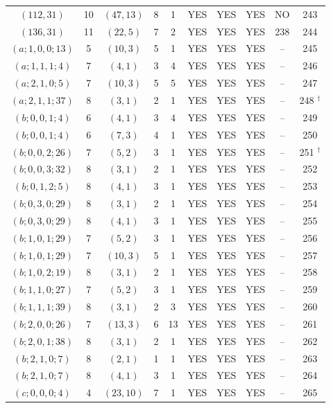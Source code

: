 \begin{longtable}{|c|c|c|c|c|c|c|c|c|c|}
$(112, 31)$ & 10 & $(47, 13)$ & 8 & 1 & YES & YES & YES & NO & 243\\
$(136, 31)$ & 11 & $(22, 5)$ & 7 & 2 & YES & YES & YES & 238 & 244\\
$(a; 1, 0, 0; 13)$ & 5 & $(10, 3)$ & 5 & 1 & YES & YES & YES & -- & 245\\
$(a; 1, 1, 1; 4)$ & 7 & $(4, 1)$ & 3 & 4 & YES & YES & YES & -- & 246\\
$(a; 2, 1, 0; 5)$ & 7 & $(10, 3)$ & 5 & 5 & YES & YES & YES & -- & 247\\
$(a; 2, 1, 1; 37)$ & 8 & $(3, 1)$ & 2 & 1 & YES & YES & YES & -- & 248 ${}^\dagger$\\
$(b; 0, 0, 1; 4)$ & 6 & $(4, 1)$ & 3 & 4 & YES & YES & YES & -- & 249\\
$(b; 0, 0, 1; 4)$ & 6 & $(7, 3)$ & 4 & 1 & YES & YES & YES & -- & 250\\
$(b; 0, 0, 2; 26)$ & 7 & $(5, 2)$ & 3 & 1 & YES & YES & YES & -- & 251 ${}^\dagger$\\
$(b; 0, 0, 3; 32)$ & 8 & $(3, 1)$ & 2 & 1 & YES & YES & YES & -- & 252\\
$(b; 0, 1, 2; 5)$ & 8 & $(4, 1)$ & 3 & 1 & YES & YES & YES & -- & 253\\
$(b; 0, 3, 0; 29)$ & 8 & $(3, 1)$ & 2 & 1 & YES & YES & YES & -- & 254\\
$(b; 0, 3, 0; 29)$ & 8 & $(4, 1)$ & 3 & 1 & YES & YES & YES & -- & 255\\
$(b; 1, 0, 1; 29)$ & 7 & $(5, 2)$ & 3 & 1 & YES & YES & YES & -- & 256\\
$(b; 1, 0, 1; 29)$ & 7 & $(10, 3)$ & 5 & 1 & YES & YES & YES & -- & 257\\
$(b; 1, 0, 2; 19)$ & 8 & $(3, 1)$ & 2 & 1 & YES & YES & YES & -- & 258\\
$(b; 1, 1, 0; 27)$ & 7 & $(5, 2)$ & 3 & 1 & YES & YES & YES & -- & 259\\
$(b; 1, 1, 1; 39)$ & 8 & $(3, 1)$ & 2 & 3 & YES & YES & YES & -- & 260\\
$(b; 2, 0, 0; 26)$ & 7 & $(13, 3)$ & 6 & 13 & YES & YES & YES & -- & 261\\
$(b; 2, 0, 1; 38)$ & 8 & $(3, 1)$ & 2 & 1 & YES & YES & YES & -- & 262\\
$(b; 2, 1, 0; 7)$ & 8 & $(2, 1)$ & 1 & 1 & YES & YES & YES & -- & 263\\
$(b; 2, 1, 0; 7)$ & 8 & $(4, 1)$ & 3 & 1 & YES & YES & YES & -- & 264\\
$(c; 0, 0, 0; 4)$ & 4 & $(23, 10)$ & 7 & 1 & YES & YES & YES & -- & 265\\

\end{longtable}
